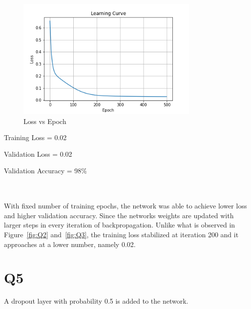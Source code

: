 \documentclass[11pt]{extarticle}
\begin{document}
\begin{figure}[h]
\centering
\includegraphics[width=0.8\textwidth]{Q4.png}
\caption{Loss vs Epoch}\label{fig:Q4}
\end{figure}
\begin{minipage}{0.3\textwidth}
    Training Loss = 0.02
\end{minipage}
\begin{minipage}{0.3\textwidth}
    Validation Loss = 0.02
\end{minipage}
\begin{minipage}{0.3\textwidth}
    Validation Accuracy = 98\%
\end{minipage}
\\
\\
With fixed number of training epochs, the network was able to achieve lower loss and higher validation accuracy. Since the networks weights are updated with larger steps in every iteration of backpropagation. Unlike what is observed in Figure~\ref{fig:Q2} and~\ref{fig:Q3}, the training loss stabilized at iteration 200 and it approaches at a lower number, namely 0.02.  

\pagebreak

\section{Q5}

A dropout layer with probability 0.5 is added to the network.
\end{document}

